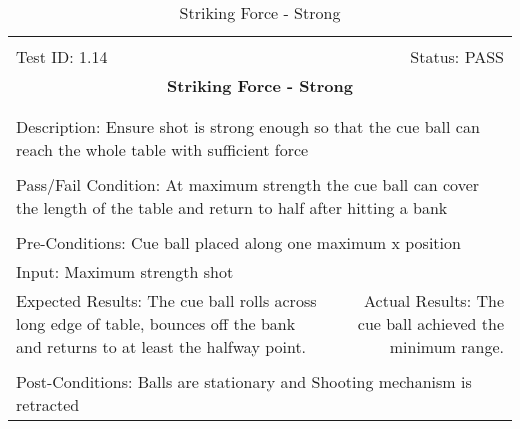 \documentclass[titlepage]{article}
\begin{document}
\begin{center}
\begin{table}[h!]
\begin{tabular}{|l r|}\hline&\\[-2mm]
	Test ID: 1.14	&Status: PASS\\[-3mm]
	\multicolumn{2}{|c|}{\textbf{\large{Striking Force - Strong}}}\\&\\\hline&\\[-3mm]
	\multicolumn{2}{|p{\textwidth}|}{Description: Ensure shot is strong enough so that the cue ball can reach the whole table with sufficient force}\\[1mm]\hline&\\[-3mm]
	\multicolumn{2}{|p{\textwidth}|}{Pass/Fail Condition: At maximum strength the cue ball can cover the length of the table and return to half after hitting a bank}\\[1mm]\hline&\\[-3mm]
	\multicolumn{2}{|p{\textwidth}|}{Pre-Conditions: Cue ball placed along one maximum x position}\\[4mm]
	\multicolumn{2}{|p{\textwidth}|}{Input: Maximum strength shot}\\[2mm]\hline
	\multicolumn{1}{|p{0.49\textwidth}}{Expected Results: The cue ball rolls across long edge of table, bounces off the bank and returns to at least the halfway point.}	&\multicolumn{1}{|p{0.45\textwidth}|}{Actual Results: The cue ball achieved the minimum range.}\\\hline&\\[-3mm]
	\multicolumn{2}{|p{\textwidth}|}{Post-Conditions: Balls are stationary and Shooting mechanism is retracted}\\\hline
\end{tabular}
\caption{Striking Force - Strong}
\end{table}
\end{center}
\end{document}
